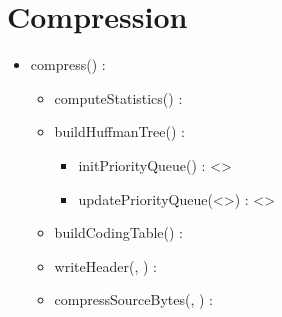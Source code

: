 \section{Compression}


\begin{itemize}
    \item compress(\binaryFile) : \binaryFile
    \begin{itemize}
        \item computeStatistics(\binaryFile) : \statistics
        \item buildHuffmanTree(\statistics) : \huffmanTree
        \begin{itemize}
            \item initPriorityQueue(\statistics) : \priorityQueue<\huffmanTree>
            \item updatePriorityQueue(\priorityQueue<\huffmanTree>) : \priorityQueue<\huffmanTree>
        \end{itemize}
        \item buildCodingTable(\huffmanTree) : \codingTable
        \item writeHeader(\binaryFile, \codingTable) : \binaryFile
        \item compressSourceBytes(\binaryFile, \codingTable) : \binaryFile
    \end{itemize}
\end{itemize}

